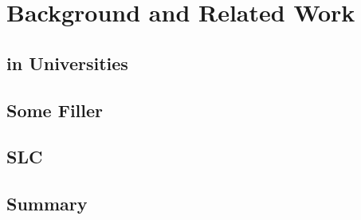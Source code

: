 \chapter{Background and Related Work\label{cha:litrev}}


\section{\LLLc in Universities}


\section{Some Filler}
 
\section{SLC}
 
\section{Summary}